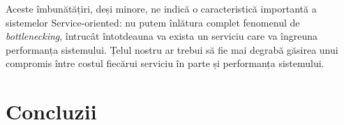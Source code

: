 \documentclass[12pt]{article}
\begin{document}
            Aceste îmbunătățiri, deși minore, ne indică o caracteristică importantă a sistemelor Service-oriented: nu putem înlătura complet fenomenul de \textit{bottlenecking}, întrucât întotdeauna va exista un serviciu care va îngreuna performanța sistemului. Țelul nostru ar trebui să fie mai degrabă găsirea unui compromis între costul fiecărui serviciu în parte și performanța sistemului.
            \pagebreak

    \section{Concluzii}
        \lipsum[1-2]
\end{document}
